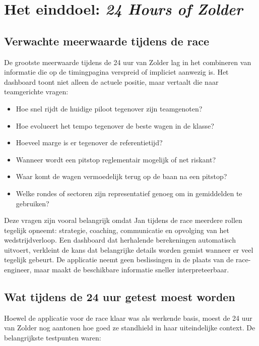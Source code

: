 
\section{Het einddoel: \emph{24 Hours of Zolder}}
\label{chap:24hofZolder}

\subsection{Verwachte meerwaarde tijdens de race}
De grootste meerwaarde tijdens de 24 uur van Zolder lag in het combineren van informatie die op de
timingpagina verspreid of impliciet aanwezig is. Het dashboard toont niet alleen de actuele positie,
maar vertaalt die naar teamgerichte vragen:

\begin{itemize}
  \item Hoe snel rijdt de huidige piloot tegenover zijn teamgenoten?
  \item Hoe evolueert het tempo tegenover de beste wagen in de klasse?
  \item Hoeveel marge is er tegenover de referentietijd?
  \item Wanneer wordt een pitstop reglementair mogelijk of net riskant?
  \item Waar komt de wagen vermoedelijk terug op de baan na een pitstop?
  \item Welke rondes of sectoren zijn representatief genoeg om in gemiddelden te gebruiken?
\end{itemize}

Deze vragen zijn vooral belangrijk omdat Jan tijdens de race meerdere rollen tegelijk opneemt:
strategie, coaching, communicatie en opvolging van het wedstrijdverloop. Een dashboard dat
herhalende berekeningen automatisch uitvoert, verkleint de kans dat belangrijke details worden
gemist wanneer er veel tegelijk gebeurt. De applicatie neemt geen beslissingen in de plaats van de
race-engineer, maar maakt de beschikbare informatie sneller interpreteerbaar.

\subsection{Wat tijdens de 24 uur getest moest worden}
Hoewel de applicatie voor de race klaar was als werkende basis, moest de 24 uur van Zolder nog
aantonen hoe goed ze standhield in haar uiteindelijke context. De belangrijkste testpunten
waren:

